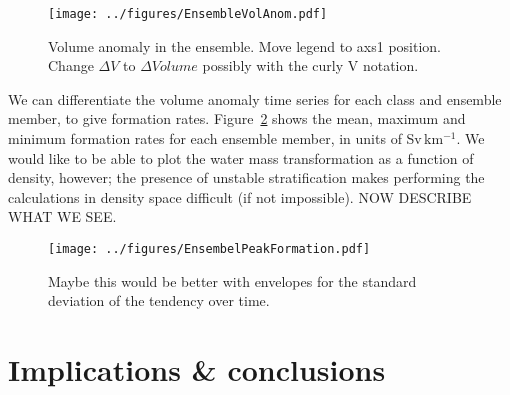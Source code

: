 \begin{figure} 
    \centering
    \texttt{[image: ../figures/EnsembleVolAnom.pdf]}
    \caption{Volume anomaly in the ensemble. Move legend to axs1 position. Change $\Delta V$ to $\Delta Volume$ possibly with the curly V notation.}
    \label{fig:EnsVolAnom}
\end{figure}

We can differentiate the volume anomaly time series for each class and ensemble member, to give formation rates. Figure~\ref{fig:EnsPkFormation} shows the mean, maximum and minimum formation rates for each ensemble member, in units of Sv\,km$^{-1}$. We would like to be able to plot the water mass transformation as a function of density, however; the presence of unstable stratification makes performing the calculations in density space difficult (if not impossible). NOW DESCRIBE WHAT WE SEE.

\begin{figure} 
    \centering
    \texttt{[image: ../figures/EnsembelPeakFormation.pdf]}
    \caption{Maybe this would be better with envelopes for the standard deviation of the tendency over time.}
    \label{fig:EnsPkFormation}
\end{figure}


\section{Implications \& conclusions}
\label{sec:IrmConc}